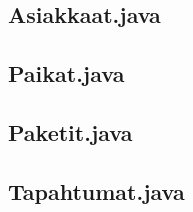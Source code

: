 \documentclass[11pt,a4paper]{article}
\begin{document}
\subsection*{Asiakkaat.java}

\newpage

\subsection*{Paikat.java}

\newpage

\subsection*{Paketit.java}

\newpage

\subsection*{Tapahtumat.java}

\end{document}
